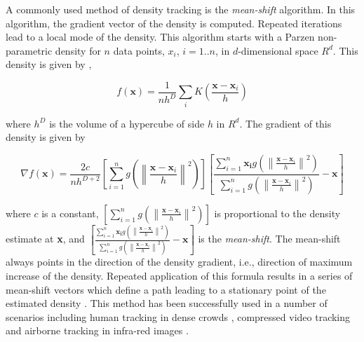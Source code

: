 \documentclass[12pt,letterpaper,doublespaced,ETD,proposal]{gt-ece-thesis}
\begin{document}
\begin{Body}
A commonly used method of density tracking is the \emph{mean-shift} algorithm.  In this algorithm, the gradient vector of the density is computed.  Repeated iterations lead to a local mode of the density.  This algorithm starts with a Parzen non-parametric density for $n$ data points, $x_i$, $i=1..n$, in $d$-dimensional space $R^d$.  This density is given by \cite{2007_BOOK_PRML_Bishop},

\begin{equation}
f(\mathbf{x}) = \frac{1}{nh^D}\sum_i K(\frac{\mathbf{x}-\mathbf{x}_i}{h})
\label{Eq:ParzenDensity}
\end{equation} 

where $h^D$ is the volume of a hypercube of side $h$ in $R^d$.  The gradient of this density is given by

\begin{equation}
\nabla f(\mathbf{x}) = \frac{2c}{nh^{D+2}} 
\left[ \sum_{i=1}^n  g \left({ \left\|   \frac{\mathbf{x}-\mathbf{x}_i}{h}\right\| }^2 \right) \right] 
\left[ \frac{ \sum_{i=1}^n  \mathbf{\mathbf{x}_i}g \left({ \left\|   \frac{\mathbf{x}-\mathbf{x}_i}{h}\right\| }^2 \right)}{\sum_{i=1}^n  g \left({ \left\|   \frac{\mathbf{x}-\mathbf{x}_i}{h}\right\| }^2 \right)} -\mathbf{x}\right] 
\end{equation}

where $c$ is a constant, $\left[ \sum_{i=1}^n  g \left({ \left\|   \frac{\mathbf{x}-\mathbf{x}_i}{h}\right\| }^2 \right) \right]$ is proportional to the density estimate at \textbf{x}, and $\left[ \frac{ \sum_{i=1}^n  \mathbf{\mathbf{x}_i}g \left({ \left\|   \frac{\mathbf{x}-\mathbf{x}_i}{h}\right\| }^2 \right)}{\sum_{i=1}^n  g \left({ \left\|   \frac{\mathbf{x}-\mathbf{x}_i}{h}\right\| }^2 \right)} -\mathbf{x}\right]$ is the \emph{mean-shift}.  The mean-shift always points in the direction of the density gradient, i.e., direction of maximum increase of the density.  Repeated application of this formula results in a series of mean-shift vectors which define a path leading to a stationary point of the estimated density \cite{2002_JNL_MeanShift_Comaniciu}.  This method has been successfully used in a number of scenarios including human tracking in dense crowds \cite{2000_CNF_RealTimeTrackingMeanShift_Comaniciu}, compressed video tracking \cite{2009_CNF_Compensation_Aslam} and airborne tracking in infra-red images \cite{2003_JNL_AirborneIRtracking_Yilmaz}.  


\end{Body}
\end{document}
